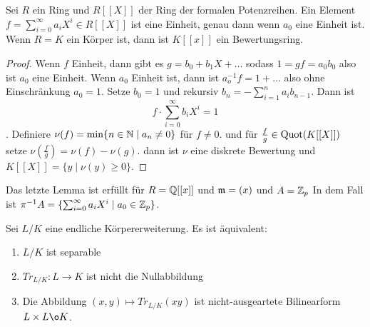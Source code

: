 \begin{Bsp}
	Sei \(R\) ein Ring und \(R[[X]]\) der Ring der formalen Potenzreihen. Ein Element 
	\(f=\sum_{i=0}^\infty a_iX^i\in R[[X]]\) ist eine Einheit, genau dann wenn \(a_0\) eine Einheit ist. Wenn
	\(R=K\) ein Körper ist, dann ist \(K[[x]]\) ein Bewertungsring.
\end{Bsp}
\begin{proof}
	Wenn \(f\) Einheit, dann gibt es \(g=b_0+b_1X+\dots\) sodass 
	\(1=gf=a_0b_0\) also ist \(a_0\) eine Einheit.
	Wenn \(a_0\) Einheit ist, dann ist \(a_o^{-1}f=1+\dots\) also ohne Einschränkung \(a_0=1\).
	Setze \(b_0=1\) und rekursiv \(b_n=-\sum_{i=1}^na_ib_{n-1}\). Dann ist 
	\[f\cdot \sum_{i=0}^\infty b_iX^i=1\].
	Definiere \(\nu(f)=\min\{n\in\mathbb{N}\mid a_n\neq 0\}\) für \(f\neq 0\).
	und für \(\frac f g \in \operatorname{Quot}(K[[X]])\) setze \(\nu(\frac f g)=\nu(f)-\nu(g)\).
	dann ist \(\nu\) eine diskrete Bewertung und \(K[[X]]=\{ y \mid \nu(y)\geq 0\}\).
\end{proof}
\begin{Bsp}
	Das letzte Lemma ist erfüllt für \(R=\mathbb{Q}[[x]]\) und \(\mathfrak{m}=(x)\) und \(A=\mathbb{Z}_p\)
	In dem Fall ist \(\pi^{-1}A=\{\sum_{i=0}^\infty a_iX^i\mid a_0\in\mathbb{Z}_p\}\).
\end{Bsp}
\begin{Satz}
	Sei \(L/K\) eine endliche Körpererweiterung. Es ist äquivalent:
	\begin{enumerate}
		\item \(L/K\) ist separable
		\item \(Tr_{L/K}\colon L\to K\) ist nicht die Nullabbildung
		\item Die Abbildung \((x,y)\mapsto Tr_{L/K}(xy)\) ist nicht-ausgeartete Bilinearform \(L\times L\o K\).
	\end{enumerate}
\end{Satz}

